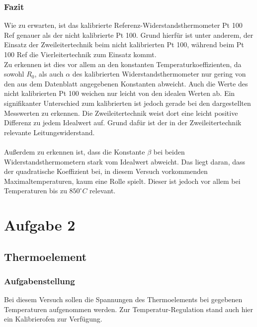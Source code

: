 \documentclass[a4paper,11pt,oneside]{article}
\begin{document}
\subsubsection{Fazit}
Wie zu erwarten, ist das kalibrierte Referenz-Widerstandsthermometer Pt 100 Ref genauer als der nicht kalibrierte Pt 100. Grund hierfür ist unter anderem, der Einsatz der Zweileitertechnik beim nicht kalibrierten Pt 100, während beim Pt 100 Ref die Vierleitertechnik zum Einsatz kommt. \\
Zu erkennen ist dies vor allem an den konstanten Temperaturkoeffizienten, da sowohl $R_0$, als auch $\alpha$ des kalibrierten Widerstandsthermometer nur gering von den aus dem Datenblatt angegebenen Konstanten abweicht. Auch die Werte des nicht kalibrierten Pt 100 weichen nur leicht von den idealen Werten ab. Ein signifikanter Unterschied zum kalibrierten ist jedoch gerade bei den dargestellten Messwerten zu erkennen. Die Zweileitertechnik weist dort eine leicht positive Differenz zu jedem Idealwert auf. Grund dafür ist der in der Zweileitertechnik relevante Leitungswiderstand.\\\\
Außerdem zu erkennen ist, dass die Konstante $\beta$ bei beiden Widerstandsthermometern stark vom Idealwert abweicht. Das liegt daran, dass der quadratische Koeffizient bei, in diesem Versuch vorkommenden Maximaltemperaturen, kaum eine Rolle spielt. Dieser ist jedoch vor allem bei Temperaturen bis zu $850^\circ C$ relevant. 

\section{Aufgabe 2}
\subsection{Thermoelement}
\subsubsection{Aufgabenstellung}
Bei diesem Versuch sollen die Spannungen des Thermoelements bei gegebenen Temperaturen aufgenommen werden. Zur Temperatur-Regulation stand auch hier ein Kalibrierofen zur Verfügung. \\
\end{document}

